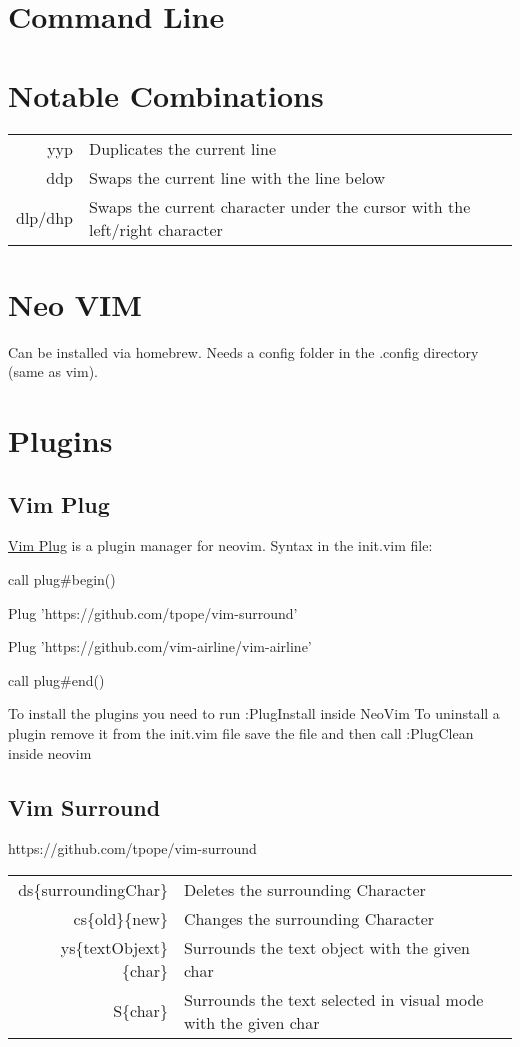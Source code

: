 \documentclass{article}
\begin{document}
\section{Command Line}

\section{Notable Combinations}
\begin{tabular}{ r l }
 yyp & Duplicates the current line \\[0.5ex]
 ddp & Swaps the current line with the line below\\[0.5ex]
 dlp/dhp & Swaps the current character under the cursor with the left/right character\\[0.5ex]
\end{tabular} 

\section{Neo VIM}
Can be installed via homebrew. Needs a config folder in the .config directory (same as vim). 

\section{Plugins}
\subsection{Vim Plug}
\href{https://github.com/junegunn/vim-plug}{Vim Plug} is a plugin manager for neovim. 
Syntax in the init.vim file:

call plug\#begin()

Plug 'https://github.com/tpope/vim-surround'

Plug 'https://github.com/vim-airline/vim-airline'

call plug\#end()


\noindent To install the plugins you need to run :PlugInstall inside NeoVim
To uninstall a plugin remove it from the init.vim file save the file and then call :PlugClean inside neovim
\subsection{Vim Surround}
https://github.com/tpope/vim-surround

\begin{tabular}{ r l }
 ds\{surroundingChar\} & Deletes the surrounding Character\\[0.5ex]
 cs\{old\}\{new\} & Changes the surrounding Character\\[0.5ex]
 ys\{textObjext\}\{char\} & Surrounds the text object with the given char\\[0.5ex]
 S\{char\}& Surrounds the text selected in visual mode with the given char\\[0.5ex]
 \end{tabular} 
 
\end{document}
